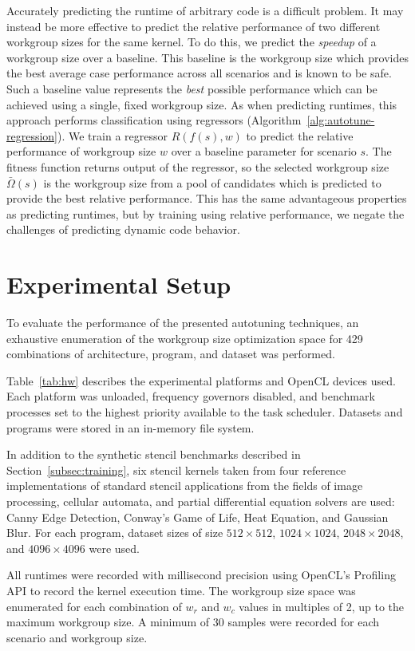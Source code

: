 Accurately predicting the runtime of arbitrary code is a difficult
problem. It may instead be more effective to predict the relative
performance of two different workgroup sizes for the same kernel. To
do this, we predict the \emph{speedup} of a workgroup size over a
baseline. This baseline is the workgroup size which provides the best
average case performance across all scenarios and is known to be
safe. Such a baseline value represents the \emph{best} possible
performance which can be achieved using a single, fixed workgroup
size. As when predicting runtimes, this approach performs
classification using regressors
(Algorithm~\ref{alg:autotune-regression}). We train a regressor
$R(f(s), w)$ to predict the relative performance of workgroup size $w$
over a baseline parameter for scenario $s$. The fitness function
returns output of the regressor, so the selected workgroup size
$\bar{\Omega}(s)$ is the workgroup size from a pool of candidates
which is predicted to provide the best relative performance. This has
the same advantageous properties as predicting runtimes, but by
training using relative performance, we negate the challenges of
predicting dynamic code behavior.


\section{Experimental Setup}

To evaluate the performance of the presented autotuning techniques, an
exhaustive enumeration of the workgroup size optimization space for
429 combinations of architecture, program, and dataset was performed.

Table~\ref{tab:hw} describes the experimental platforms and OpenCL
devices used. Each platform was unloaded, frequency governors
disabled, and benchmark processes set to the highest priority
available to the task scheduler. Datasets and programs were stored in
an in-memory file system.

In addition to the synthetic stencil benchmarks described in
Section~\ref{subsec:training}, six stencil kernels taken from four
reference implementations of standard stencil applications from the
fields of image processing, cellular automata, and partial
differential equation solvers are used: Canny Edge Detection, Conway's
Game of Life, Heat Equation, and Gaussian Blur. For each program,
dataset sizes of size $512\times512$, $1024\times1024$,
$2048\times2048$, and $4096\times4096$ were used.

All runtimes were recorded with millisecond precision using OpenCL's
Profiling API to record the kernel execution time. The workgroup size
space was enumerated for each combination of $w_r$ and $w_c$ values in
multiples of 2, up to the maximum workgroup size. A minimum of 30
samples were recorded for each scenario and workgroup size.

